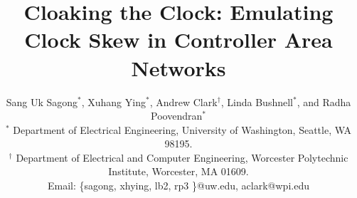 \documentclass[conference]{IEEEtran}
\begin{document}
\title{Cloaking the Clock: Emulating Clock Skew in Controller Area Networks
}

\author{Sang Uk Sagong$^{\ast}$, Xuhang Ying$^{\ast}$, Andrew Clark$^{\dagger}$, Linda Bushnell$^{\ast}$, and Radha Poovendran$^{\ast}$\\
$^{\ast}$ Department of Electrical Engineering, University of Washington, Seattle, WA 98195. \\
$^{\dagger}$ Department of Electrical and Computer Engineering, Worcester Polytechnic Institute, Worcester, MA 01609. \\
Email: \{sagong, xhying, lb2, rp3 \}@uw.edu, aclark@wpi.edu
}

%
\end{document}
